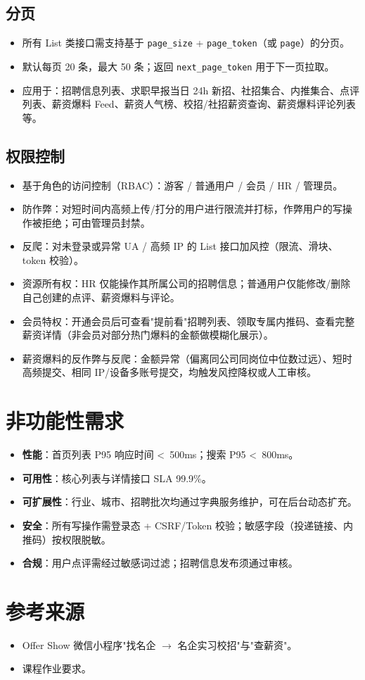 \documentclass[12pt,a4paper]{ctexart}
\begin{document}
\subsection{分页}
\begin{itemize}[leftmargin=2em]
    \item 所有 List 类接口需支持基于 \texttt{page\_size} + \texttt{page\_token}（或 \texttt{page}）的分页。
    \item 默认每页 20 条，最大 50 条；返回 \texttt{next\_page\_token} 用于下一页拉取。
    \item 应用于：招聘信息列表、求职早报当日 24h 新招、社招集合、内推集合、点评列表、薪资爆料 Feed、薪资人气榜、校招/社招薪资查询、薪资爆料评论列表等。
\end{itemize}

\subsection{权限控制}
\begin{itemize}[leftmargin=2em]
    \item 基于角色的访问控制（RBAC）：游客 / 普通用户 / 会员 / HR / 管理员。
    \item 防作弊：对短时间内高频上传/打分的用户进行限流并打标，作弊用户的写操作被拒绝；可由管理员封禁。
    \item 反爬：对未登录或异常 UA / 高频 IP 的 List 接口加风控（限流、滑块、token 校验）。
    \item 资源所有权：HR 仅能操作其所属公司的招聘信息；普通用户仅能修改/删除自己创建的点评、薪资爆料与评论。
    \item 会员特权：开通会员后可查看"提前看"招聘列表、领取专属内推码、查看完整薪资详情（非会员对部分热门爆料的金额做模糊化展示）。
    \item 薪资爆料的反作弊与反爬：金额异常（偏离同公司同岗位中位数过远）、短时高频提交、相同 IP/设备多账号提交，均触发风控降权或人工审核。
\end{itemize}

\section{非功能性需求}
\begin{itemize}[leftmargin=2em]
    \item \textbf{性能}：首页列表 P95 响应时间 \textless~500ms；搜索 P95 \textless~800ms。
    \item \textbf{可用性}：核心列表与详情接口 SLA 99.9\%。
    \item \textbf{可扩展性}：行业、城市、招聘批次均通过字典服务维护，可在后台动态扩充。
    \item \textbf{安全}：所有写操作需登录态 + CSRF/Token 校验；敏感字段（投递链接、内推码）按权限脱敏。
    \item \textbf{合规}：用户点评需经过敏感词过滤；招聘信息发布须通过审核。
\end{itemize}

\section{参考来源}
\begin{itemize}[leftmargin=2em]
    \item Offer Show 微信小程序"找名企 $\rightarrow$ 名企实习校招"与"查薪资"。
    \item 课程作业要求。
\end{itemize}
\end{document}
